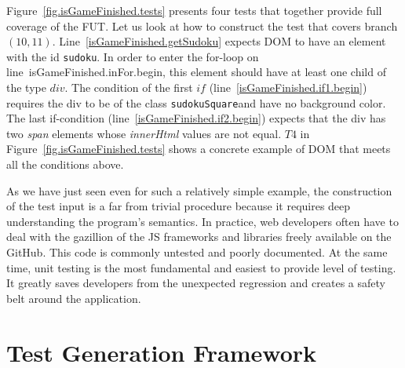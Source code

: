 \documentclass[sigconf]{acmart}
\begin{document}

Figure~\ref{fig.isGameFinished.tests} presents four tests that together provide full coverage of the FUT. Let us look at how to construct the test that covers branch $(10,11)$. Line~\ref{isGameFinished.getSudoku} expects DOM to have an element with the id \textquotesingle\texttt{sudoku}\textquotesingle. In order to enter the for-loop on line~{isGameFinished.inFor.begin}, this element should have at least one child of the type $div$. The condition of the first $if$ (line~\ref{isGameFinished.if1.begin}) requires the div to be of the class \textquotesingle\texttt{sudokuSquare}\textquotesingle and have no background color. The last if-condition (line~\ref{isGameFinished.if2.begin}) expects that the div has two \emph{span} elements whose \emph{innerHtml} values are not equal. $T4$ in Figure~\ref{fig.isGameFinished.tests} shows a concrete example of DOM that meets all the conditions above. 

As we have just seen even for such a relatively simple example, the construction of the test input is a far from trivial procedure because it requires deep understanding the program's semantics. In practice, web developers often have to deal with the gazillion of the JS frameworks and libraries freely available on the GitHub. This code is commonly untested and poorly documented. At the same time, unit testing is the most fundamental and easiest to provide level of testing. It greatly saves developers from the unexpected regression and creates a safety belt around the application.

\section{Test Generation Framework}
\label{sec.framework}
\end{document}
